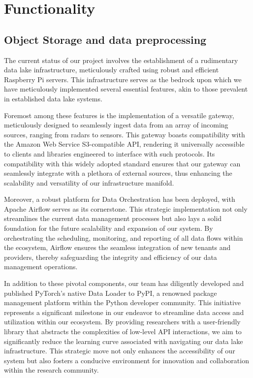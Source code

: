 \section{Functionality}

\subsection{Object Storage and data preprocessing}
The current status of our project involves the establishment of a rudimentary
data lake infrastructure, meticulously crafted using robust and efficient
Raspberry Pi servers. This infrastructure serves as the bedrock upon which we
have meticulously implemented several essential features, akin to those
prevalent in established data lake systems.

Foremost among these features is the implementation of a versatile gateway,
meticulously designed to seamlessly ingest data from an array of incoming
sources, ranging from radars to sensors. This gateway boasts compatibility with
the Amazon Web Service S3-compatible API, rendering it universally accessible to
clients and libraries engineered to interface with such protocols. Its
compatibility with this widely adopted standard ensures that our gateway can
seamlessly integrate with a plethora of external sources, thus enhancing the
scalability and versatility of our infrastructure manifold.

Moreover, a robust platform for Data Orchestration has been deployed, with
Apache Airflow serves as its cornerstone. This strategic implementation not
only streamlines the current data management processes but also lays a solid
foundation for the future scalability and expansion of our system. By
orchestrating the scheduling, monitoring, and reporting of all data flows within
the ecosystem, Airflow ensures the seamless integration of new tenants and
providers, thereby safeguarding the integrity and efficiency of our data
management operations.

In addition to these pivotal components, our team has diligently developed and
published PyTorch's native Data Loader to PyPI, a renowned package management
platform within the Python developer community. This initiative represents a
significant milestone in our endeavor to streamline data access and utilization
within our ecosystem. By providing researchers with a user-friendly library that
abstracts the complexities of low-level API interactions, we aim to
significantly reduce the learning curve associated with navigating our data lake
infrastructure. This strategic move not only enhances the accessibility of our
system but also fosters a conducive environment for innovation and collaboration
within the research community.

